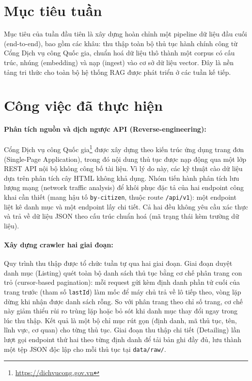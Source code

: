 \documentclass[11pt]{article}
\begin{document}

\section{Mục tiêu tuần}
Mục tiêu của tuần đầu tiên là xây dựng hoàn chỉnh một pipeline dữ liệu đầu cuối (end-to-end),
bao gồm các khâu: thu thập toàn bộ thủ tục hành chính công từ Cổng Dịch vụ công Quốc gia,
chuẩn hoá dữ liệu thô thành một corpus có cấu trúc, nhúng (embedding) và nạp (ingest) vào cơ
sở dữ liệu vector. Đây là nền tảng tri thức cho toàn bộ hệ thống RAG được phát triển ở các
tuần kế tiếp.

\section{Công việc đã thực hiện}

\paragraph{Phân tích nguồn và dịch ngược API (Reverse-engineering): }
Cổng Dịch vụ công Quốc gia\footnote{\url{https://dichvucong.gov.vn}} được xây dựng theo kiến
trúc ứng dụng trang đơn (Single-Page Application), trong đó nội dung thủ tục được nạp động
qua một lớp REST API nội bộ không công bố tài liệu. Vì lý do này, các kỹ thuật cào dữ liệu
dựa trên phân tích cây HTML không khả dụng. Nhóm tiến hành phân tích lưu lượng mạng (network
traffic analysis) để khôi phục đặc tả của hai endpoint công khai cần thiết (mang hậu tố
\texttt{by-citizen}, thuộc route \texttt{/api/v1}): một endpoint liệt kê danh mục và một
endpoint lấy chi tiết. Cả hai đều không yêu cầu xác thực và trả về dữ liệu JSON theo cấu trúc
chuẩn hoá (mã trạng thái kèm trường dữ liệu).

\paragraph{Xây dựng crawler hai giai đoạn: }
Quy trình thu thập được tổ chức tuần tự qua hai giai đoạn. Giai đoạn duyệt danh mục (Listing)
quét toàn bộ danh sách thủ tục bằng cơ chế phân trang con trỏ (cursor-based pagination): mỗi
request gửi kèm định danh phần tử cuối của trang trước (tham số \texttt{lastId}) làm mốc để
máy chủ trả về lô tiếp theo, vòng lặp dừng khi nhận được danh sách rỗng. So với phân trang
theo chỉ số trang, cơ chế này giảm thiểu rủi ro trùng lặp hoặc bỏ sót khi danh mục thay đổi
ngay trong lúc thu thập. Kết quả là một bộ chỉ mục rút gọn (định danh, mã thủ tục, tên, lĩnh
vực, cơ quan) cho từng thủ tục. Giai đoạn thu thập chi tiết (Detailing) lần lượt gọi endpoint
thứ hai theo từng định danh để tải bản ghi đầy đủ, lưu thành một tệp JSON độc lập cho mỗi thủ
tục tại \texttt{data/raw/}.
\end{document}

